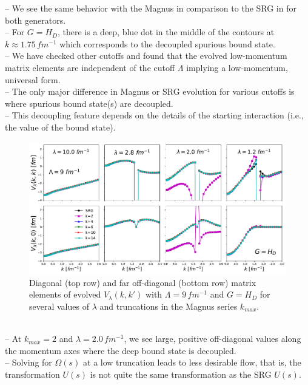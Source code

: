 \documentclass[preprintnumbers,floatfix,aps,prc,preprint,nofootinbib]{revtex4-1}
\begin{document}
%
-- We see the same behavior with the Magnus in comparison to the SRG in \cite{Wendt:2011qj} for both generators.
\\
-- For $G=H_D$, there is a deep, blue dot in the middle of the contours at $k \approx 1.75 \, fm^{-1}$ which corresponds to the decoupled spurious bound state.
\\
-- We have checked other cutoffs and found that the evolved low-momentum matrix elements are independent of the cutoff $\Lambda$ implying a low-momentum, universal form.
\\
-- The only major difference in Magnus or SRG evolution for various cutoffs is where spurious bound state(s) are decoupled.
\\
-- This decoupling feature depends on the details of the starting interaction (i.e., the value of the bound state).
\\
%
\begin{figure}
	\captionsetup{singlelinecheck=false,justification=raggedright}
  	\centering
        \includegraphics[width=14cm]{evolved_diags_Wendt_Lamb9_Wegner}
	\hspace*{0.05\textwidth}
	\caption{Diagonal (top row) and far off-diagonal (bottom row) matrix elements of evolved $V_{\lambda}(k,k')$ with $\Lambda=9 \, fm^{-1}$ and $G=H_{D}$ for several values of $\lambda$ and truncations in the Magnus series $k_{max}$.}
	\label{fig:evolved_diags_Wendt_Lamb9_Wegner}
\end{figure}
%
\\
-- At $k_{max}=2$ and $\lambda=2.0 \, fm^{-1}$, we see large, positive off-diagonal values along the momentum axes where the deep bound state is decoupled.
\\
-- Solving for $\Omega(s)$ at a low truncation leads to less desirable flow, that is, the transformation $U(s)$ is not quite the same transformation as the SRG $U(s)$.
\end{document}
